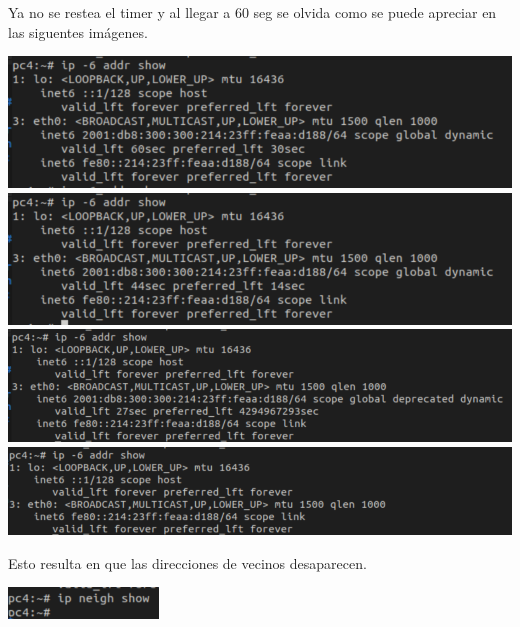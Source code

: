 \documentclass[12pt, a4paper]{report}
\begin{document}
\begin{enumerate}
	Ya no se restea el timer y al llegar a 60 seg se olvida como se puede apreciar en las siguentes imágenes.
\begin{center}
		\includegraphics[width=1\textwidth]{ej6_1_1_3}\\
	\includegraphics[width=1\textwidth]{ej6_2_1_3}\\
	\includegraphics[width=1\textwidth]{ej6_3_1_3}\\
	\includegraphics[width=1\textwidth]{ej6_4_1_3}\\
\end{center}
	Esto resulta en que las direcciones de vecinos desaparecen.
\begin{center}
		\includegraphics[width=0.3\textwidth]{ej6_5_1_3}
\end{center}
\end{enumerate}
\end{document}
